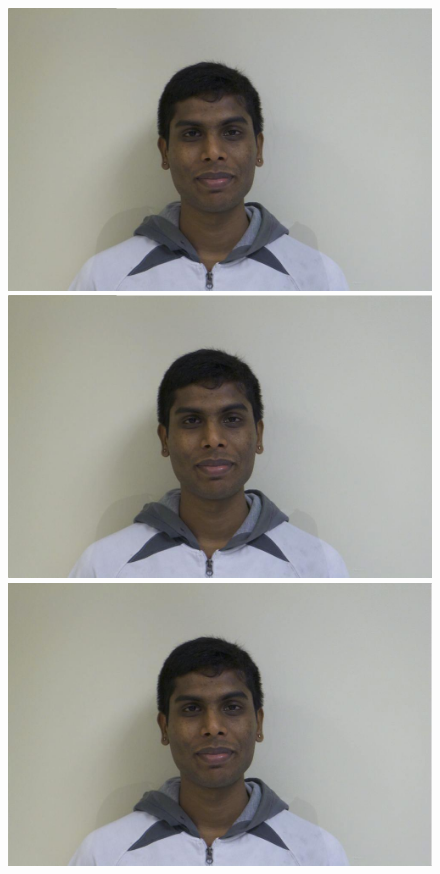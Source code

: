 \documentclass[11pt]{article}
\begin{document}
\begin{figure}[H]
\begin{center}
\includegraphics[scale=0.06]{figs/frames/morph_steinkirch_tangatur_55.jpg} 
\includegraphics[scale=0.06]{figs/frames/morph_steinkirch_tangatur_56.jpg} 
\includegraphics[scale=0.06]{figs/frames/morph_steinkirch_tangatur_57.jpg}  

\end{center}
\end{figure}
\end{document}
